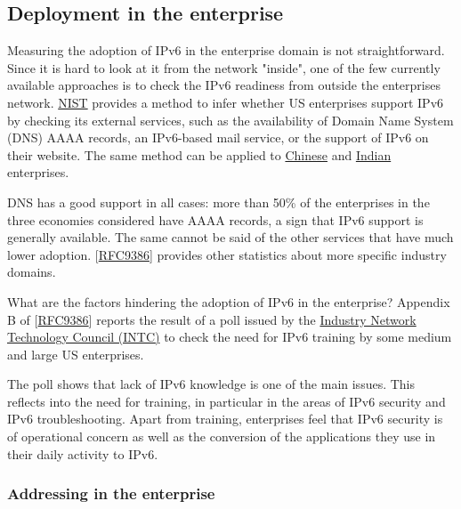 \documentclass[
]{article}
\begin{document}
\pagebreak

\subsection{Deployment in the
enterprise}\label{deployment-in-the-enterprise}

Measuring the adoption of IPv6 in the enterprise domain is not
straightforward. Since it is hard to look at it from the network
"inside", one of the few currently available approaches is to check the
IPv6 readiness from outside the enterprise\textquotesingle s network.
\href{https://fedv6-deployment.antd.nist.gov/cgi-bin/generate-com}{NIST}
provides a method to infer whether US enterprises support IPv6 by
checking its external services, such as the availability of Domain Name
System (DNS) AAAA records, an IPv6-based mail service, or the support of
IPv6 on their website. The same method can be applied to
\href{http://218.2.231.237:5001/cgi-bin/generate}{Chinese} and
\href{https://cnlabs.in/IPv6_Mon/generate_industry.html}{Indian}
enterprises.

DNS has a good support in all cases: more than 50\% of the enterprises
in the three economies considered have AAAA records, a sign that IPv6
support is generally available. The same cannot be said of the other
services that have much lower adoption.
{[}\href{https://www.rfc-editor.org/info/rfc9386}{RFC9386}{]} provides
other statistics about more specific industry domains.

What are the factors hindering the adoption of IPv6 in the enterprise?
Appendix B of
{[}\href{https://www.rfc-editor.org/info/rfc9386}{RFC9386}{]} reports
the result of a poll issued by the
\href{https://industrynetcouncil.org/}{Industry Network Technology
Council (INTC)} to check the need for IPv6 training by some medium and
large US enterprises.

The poll shows that lack of IPv6 knowledge is one of the main issues.
This reflects into the need for training, in particular in the areas of
IPv6 security and IPv6 troubleshooting. Apart from training, enterprises
feel that IPv6 security is of operational concern as well as the
conversion of the applications they use in their daily activity to IPv6.

\subsubsection{Addressing in the
enterprise}\label{addressing-in-the-enterprise}
\end{document}
